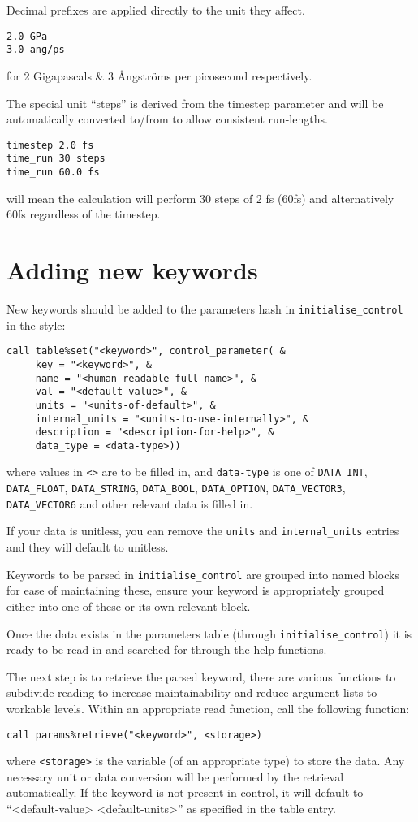 Decimal prefixes are applied directly to the unit they affect.
\begin{verbatim}
2.0 GPa
3.0 ang/ps
\end{verbatim}
for 2 Gigapascals \& 3 \AA{}ngstr\"oms per picosecond respectively.

The special unit ``steps'' is derived from the timestep parameter and will be automatically converted to/from to allow consistent run-lengths.
\begin{verbatim}
timestep 2.0 fs
time_run 30 steps
time_run 60.0 fs
\end{verbatim}
will mean the calculation will perform 30 steps of 2 fs (60fs) and alternatively 60fs regardless of the timestep.

\section{Adding new keywords}

New keywords should be added to the parameters hash in \verb#initialise_control# in the style:
\begin{verbatim}
call table%set("<keyword>", control_parameter( &
     key = "<keyword>", &
     name = "<human-readable-full-name>", &
     val = "<default-value>", &
     units = "<units-of-default>", &
     internal_units = "<units-to-use-internally>", &
     description = "<description-for-help>", &
     data_type = <data-type>))
\end{verbatim}
where values in \verb#<># are to be filled in, and \verb#data-type# is one of \verb#DATA_INT#, \verb#DATA_FLOAT#, \verb#DATA_STRING#, \verb#DATA_BOOL#, \verb#DATA_OPTION#, \verb#DATA_VECTOR3#, \verb#DATA_VECTOR6# and other relevant data is filled in.

If your data is unitless, you can remove the \verb#units# and \verb#internal_units# entries and they will default to unitless.

Keywords to be parsed in \verb#initialise_control# are grouped into named blocks for ease of maintaining these, ensure your keyword is appropriately grouped either into one of these or its own relevant block.

Once the data exists in the parameters table (through \verb#initialise_control#) it is ready to be read in and searched for through the help functions.

The next step is to retrieve the parsed keyword, there are various functions to subdivide reading to increase maintainability and reduce argument lists to workable levels. Within an appropriate read function, call the following function:
\begin{verbatim}
call params%retrieve("<keyword>", <storage>)
\end{verbatim}
where \verb#<storage># is the variable (of an appropriate type) to store the data. Any necessary unit or data conversion will be performed by the retrieval automatically. If the keyword is not present in control, it will default to ``<default-value> <default-units>'' as specified in the table entry.

